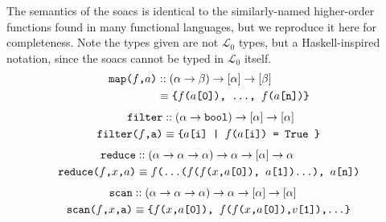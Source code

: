 \documentclass{sigplanconf}  %
\newcommand{\LO}{$\mathcal{L}_0$}
\begin{document}
The semantics of the {\sc soac}s is identical to the similarly-named
higher-order functions found in many functional languages, but we
reproduce it here for completeness.  Note the types given are not \LO{}
types, but a Haskell-inspired notation, since the {\sc soac}s cannot be 
typed in \LO{} itself.
\begin{align*}
\text{\tt map($f$,$a$)}
& :: (\alpha\rightarrow\beta)\rightarrow[\alpha]\rightarrow[\beta] \\
& \equiv \text{\tt\{$f$($a$[0]), \ldots, $f$($a$[n])\}}
\end{align*}
\begin{align*}
\text{\tt filter}
& :: (\alpha\rightarrow{\tt bool})\rightarrow[\alpha]\rightarrow[\alpha] \\
\text{\tt filter($f$,a)} & \equiv \text{\tt\{$a$[i] | $f$($a$[i]) = {\tt True }\}}
\end{align*}
\begin{align*}
\text{\tt reduce}
& :: (\alpha\rightarrow\alpha\rightarrow\alpha)\rightarrow\alpha\rightarrow[\alpha]\rightarrow\alpha \\
\text{\tt reduce($f$,$x$,$a$)} & \equiv \text{\tt $f$(\ldots($f$($f$($x$,$a$[0]), $a$[1])\ldots), $a$[n])}
\end{align*}
\begin{align*}
\text{\tt scan}
& :: (\alpha\rightarrow\alpha\rightarrow\alpha)\rightarrow\alpha\rightarrow[\alpha]\rightarrow[\alpha] \\
\text{\tt scan($f$,$x$,a)} & \equiv \text{\tt\{$f$($x$,$a$[0]), $f$($f$($x$,$a$[0]),$v$[1]),\ldots\}}
\end{align*}
\end{document}
